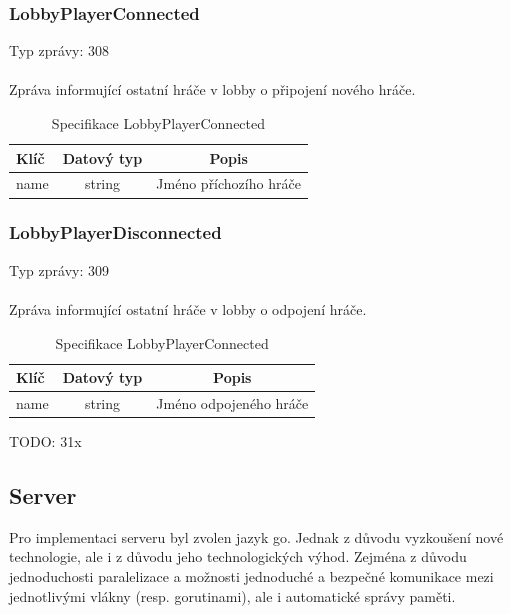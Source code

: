 \documentclass[12pt, a4paper]{article}
\begin{document}
    \subsubsection*{LobbyPlayerConnected}
    Typ zprávy: 308\\\\
    Zpráva informující ostatní hráče v lobby o připojení nového hráče.

    \begin{table}[H]
        \centering
        \begin{tabular}{|l|c|c|}
            \hline
            Klíč & Datový typ & Popis\\
            \hline
            \hline
            name & string & Jméno příchozího hráče\\
            \hline
        \end{tabular}
        \caption{Specifikace LobbyPlayerConnected}
    \end{table}

    \subsubsection*{LobbyPlayerDisconnected}
    Typ zprávy: 309\\\\
    Zpráva informující ostatní hráče v lobby o odpojení hráče.

    \begin{table}[H]
        \centering
        \begin{tabular}{|l|c|c|}
            \hline
            Klíč & Datový typ & Popis\\
            \hline
            \hline
            name & string & Jméno odpojeného hráče\\
            \hline
        \end{tabular}
        \caption{Specifikace LobbyPlayerConnected}
    \end{table}

    TODO: 31x

    \subsection{Server}
    Pro implementaci serveru byl zvolen jazyk go.
    Jednak z důvodu vyzkoušení nové technologie, ale i z důvodu jeho technologických výhod.
    Zejména z důvodu jednoduchosti paralelizace a možnosti jednoduché a bezpečné komunikace mezi jednotlivými vlákny (resp. gorutinami), ale i automatické správy paměti.
\end{document}
